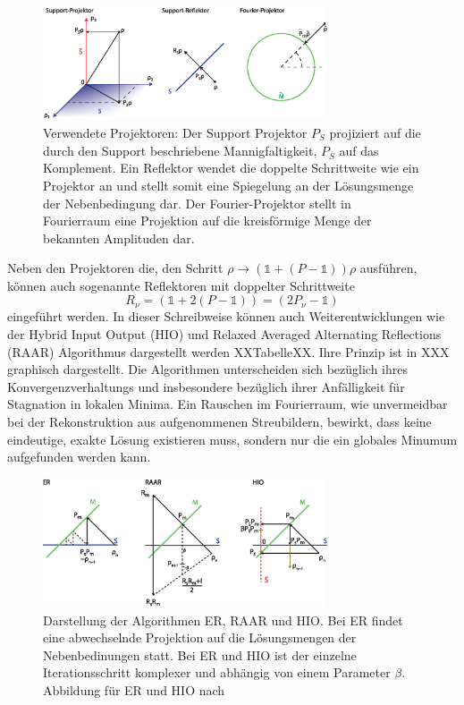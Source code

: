	\begin{figure}
		\centering
		\includegraphics[width=0.75\textwidth]{images/projektor.eps}
		\caption[Projektoren]{Verwendete Projektoren: Der Support Projektor $P_S$ projiziert auf die durch den Support beschriebene Mannigfaltigkeit, $P_{\bar{S}}$ auf das Komplement. Ein Reflektor wendet die doppelte Schrittweite wie ein Projektor an und stellt somit eine Spiegelung an der Lösungsmenge der Nebenbedingung dar. Der Fourier-Projektor stellt in Fourierraum eine Projektion auf die kreisförmige Menge der bekannten Amplituden dar.}
		\label{fig:projektoren}
	\end{figure}
	Neben den Projektoren die, den Schritt $\rho\rightarrow (\mathbb{1}+(P-\mathbb{1}))\rho$ ausführen, können auch sogenannte Reflektoren mit doppelter Schrittweite
	\begin{equation}
	R_\nu= (\mathbb{1}+2(P-\mathbb{1}))=(2P_\nu-\mathbb{1})
	\end{equation}
	eingeführt werden.
In dieser Schreibweise können auch Weiterentwicklungen wie der Hybrid Input Output (HIO) und Relaxed Averaged Alternating Reflections (RAAR) Algorithmus dargestellt werden XXTabelleXX. Ihre Prinzip ist in XXX graphisch dargestellt. Die Algorithmen unterscheiden sich bezüglich ihres Konvergenzverhaltungs und insbesondere bezüglich ihrer Anfälligkeit für Stagnation in lokalen Minima. 
Ein Rauschen im Fourierraum, wie unvermeidbar bei der Rekonstruktion aus aufgenommenen Streubildern, bewirkt, dass keine eindeutige, exakte Lösung existieren muss, sondern nur die ein globales Minumum aufgefunden werden kann. 
	\begin{figure}
		\centering
		\includegraphics[width=0.75\textwidth]{images/algorithmen.eps}
		\caption[Rekonstruktionsalgorithmen]{Darstellung der Algorithmen ER, RAAR und HIO. Bei ER findet eine abwechselnde Projektion auf die Lösungsmengen der Nebenbedinungen statt. Bei ER und HIO ist der einzelne Iterationsschritt komplexer und abhängig von einem Parameter $\beta$. Abbildung für ER und HIO nach \cite{XX}}
		\label{fig:recon}
	\end{figure} 

